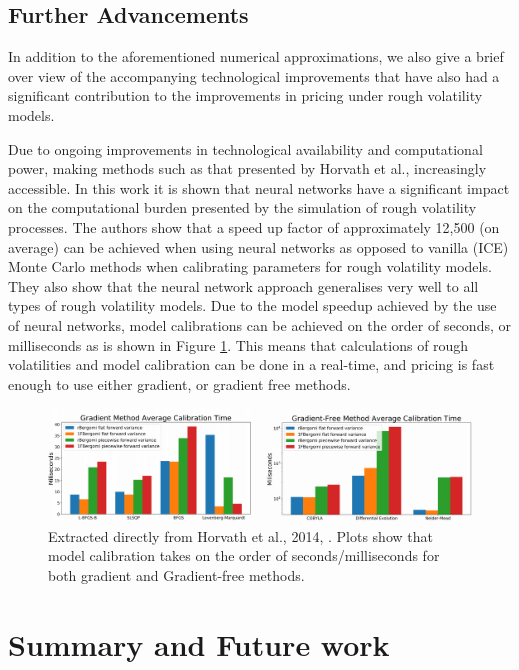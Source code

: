 \documentclass[12pt,oneside]{article}
\begin{document}
\subsection{Further Advancements}
\label{subsec:tech_advancement}
In addition to the aforementioned numerical approximations, we also give a brief over view of the accompanying technological improvements that have also had a significant contribution to the improvements in pricing under rough volatility models. 

 Due to ongoing improvements in technological availability and computational power, making methods such as that presented by
 Horvath et al., \cite{horvath2019deep} increasingly accessible. 
 In this work it is shown that neural networks have a significant impact on the computational burden presented by the simulation of rough volatility processes. The authors show that a speed up factor of approximately 12,500 (on average) can be achieved when using neural networks as opposed to vanilla (ICE) Monte Carlo methods when calibrating parameters for rough volatility models. They also show that the neural network approach generalises very well to all types of rough volatility models. 
 Due to the model speedup achieved by the use of neural networks, model calibrations can be achieved on the order of seconds, or milliseconds as is shown in Figure \ref{fig:Horvath_fig10_11}. This means that calculations of rough volatilities and model calibration can be done in a real-time, and pricing is fast enough to use either gradient, or gradient free methods.
 
 \begin{figure}[htpb]
    \centering
    \includegraphics[width=1.0\textwidth ]{figs/Horvath_fig10_11}
    \caption{Extracted directly from Horvath et al., 2014, \cite[Figures~10\&11]{horvath2019deep}. Plots show that model calibration takes on the order of seconds/milliseconds for both gradient and Gradient-free methods.}
    \label{fig:Horvath_fig10_11} 
\end{figure}

\section{Summary and Future work}
\label{sec:conclusion}
 
\end{document}
